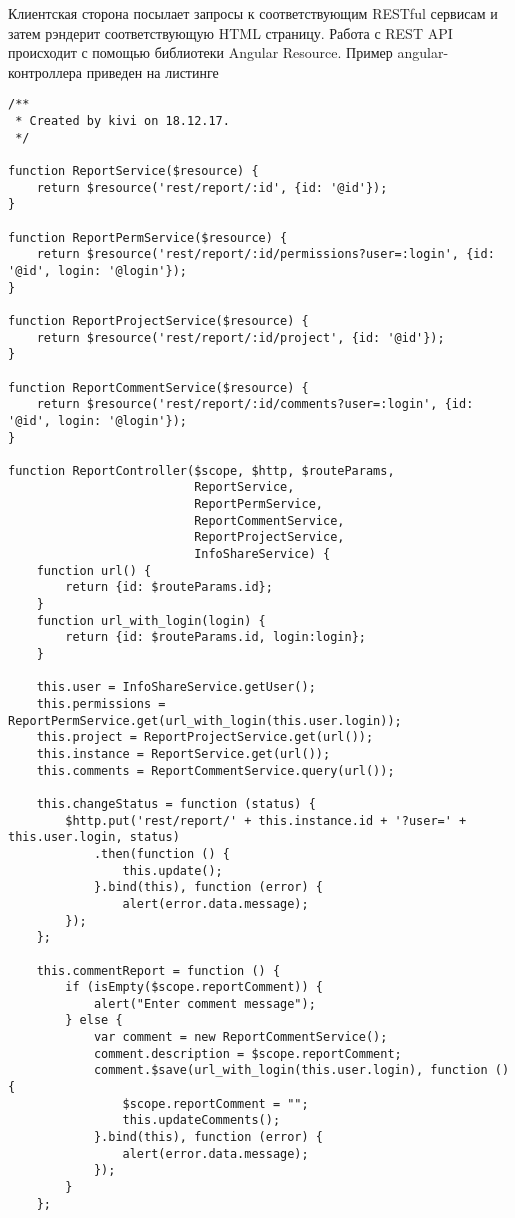 Клиентская сторона посылает запросы к соответствующим RESTful сервисам и затем рэндерит соответствующую HTML страницу. Работа с REST API происходит с помощью библиотеки Angular Resource. Пример angular-контроллера приведен на листинге
\begin{lstlisting}[style=crs_js, label={lst:jsController}, caption={Angular-контроллер}]
/**
 * Created by kivi on 18.12.17.
 */

function ReportService($resource) {
    return $resource('rest/report/:id', {id: '@id'});
}

function ReportPermService($resource) {
    return $resource('rest/report/:id/permissions?user=:login', {id: '@id', login: '@login'});
}

function ReportProjectService($resource) {
    return $resource('rest/report/:id/project', {id: '@id'});
}

function ReportCommentService($resource) {
    return $resource('rest/report/:id/comments?user=:login', {id: '@id', login: '@login'});
}

function ReportController($scope, $http, $routeParams,
                          ReportService,
                          ReportPermService,
                          ReportCommentService,
                          ReportProjectService,
                          InfoShareService) {
    function url() {
        return {id: $routeParams.id};
    }
    function url_with_login(login) {
        return {id: $routeParams.id, login:login};
    }

    this.user = InfoShareService.getUser();
    this.permissions = ReportPermService.get(url_with_login(this.user.login));
    this.project = ReportProjectService.get(url());
    this.instance = ReportService.get(url());
    this.comments = ReportCommentService.query(url());

    this.changeStatus = function (status) {
        $http.put('rest/report/' + this.instance.id + '?user=' + this.user.login, status)
            .then(function () {
                this.update();
            }.bind(this), function (error) {
                alert(error.data.message);
        });
    };

    this.commentReport = function () {
        if (isEmpty($scope.reportComment)) {
            alert("Enter comment message");
        } else {
            var comment = new ReportCommentService();
            comment.description = $scope.reportComment;
            comment.$save(url_with_login(this.user.login), function () {
                $scope.reportComment = "";
                this.updateComments();
            }.bind(this), function (error) {
                alert(error.data.message);
            });
        }
    };


\end{lstlisting}
